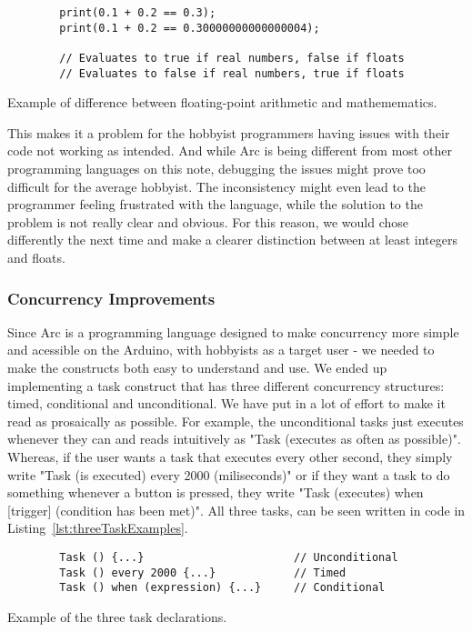 \begin{listing}[htb!]
    \begin{verbatim}
        print(0.1 + 0.2 == 0.3);
        print(0.1 + 0.2 == 0.30000000000000004);

        // Evaluates to true if real numbers, false if floats
        // Evaluates to false if real numbers, true if floats
    \end{verbatim}
    \caption{Example of difference between floating-point arithmetic and mathemematics.}
    \label{lst:semanticDifference}
\end{listing}

This makes it a problem for the hobbyist programmers having issues with their code not working as intended. And while Arc is being different from most other programming languages on this note, debugging the issues might prove too difficult for the average hobbyist. The inconsistency might even lead to the programmer feeling frustrated with the language, while the solution to the problem is not really clear and obvious. For this reason, we would chose differently the next time and make a clearer distinction between at least integers and floats.

\subsubsection{Concurrency Improvements}

Since Arc is a programming language designed to make concurrency more simple and acessible on the Arduino, with hobbyists as a target user - we needed to make the constructs both easy to understand and use. We ended up implementing a task construct that has three different concurrency structures: timed, conditional and unconditional. We have put in a lot of effort to make it read as prosaically as possible. For example, the unconditional tasks just executes whenever they can and reads intuitively as "Task (executes as often as possible)". Whereas, if the user wants a task that executes every other second, they simply write "Task (is executed) every 2000 (miliseconds)" or if they want a task to do something whenever a button is pressed, they write "Task (executes) when [trigger] (condition has been met)". All three tasks, can be seen written in code in Listing~\ref{lst:threeTaskExamples}.


\begin{listing}[htb!]
    \begin{verbatim}
        Task () {...}                       // Unconditional
        Task () every 2000 {...}            // Timed
        Task () when (expression) {...}     // Conditional
    \end{verbatim}
    \caption{Example of the three task declarations.}
    \label{lst:threeTaskExamples}
\end{listing}

